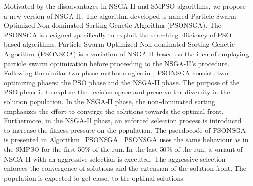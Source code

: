 \documentclass[10pt,journal,compsoc]{IEEEtran}
\begin{document}
Motivated by the disadvantages in NSGA-II and SMPSO algorithms, we propose a new version of NSGA-II. The algorithm developed is named Particle Swarm Optimized Non-dominated Sorting Genetic Algorithm (PSONSGA). The PSONSGA is designed specifically to exploit the searching efficiency of PSO-based algorithms.
Particle Swarm Optimized Non-dominated Sorting Genetic Algorithm~(PSONSGA) is a variation of NSGA-II based on the idea of employing particle swarm optimization before proceeding to the NSGA-II's procedure. Following the similar two-phase methodologies in \cite{magnier2008multiobjective,onut2008two,sabri2000multi}, PSONSGA consists two optimizing phases: the PSO phase and the NSGA-II phase. The purpose of the PSO phase is to explore the decision space and preserve the diversity in the solution population. In the NSGA-II phase, the non-dominated sorting emphasizes the effort to converge the solutions towards the optimal front. Furthermore, in the NSGA-II phase, an enforced selection process is introduced to increase the fitness pressure on the population.
The pseudocode of PSONSGA is presented in Algorithm~\ref{PSONSGA}. 
PSONSGA uses the same behaviour as in the SMPSO for the first 50\% of the run. In the last 50\% of the run, a variant of NSGA-II with an aggressive selection is executed.
The aggressive selection enforces the convergence of solutions and the extension of the solution front. The population is expected to get closer to the optimal solutions.
\end{document}
